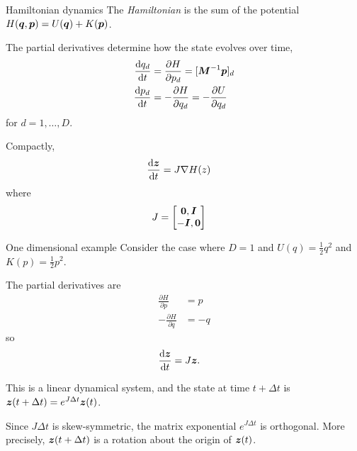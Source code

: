 \documentclass[aspectratio=169]{beamer}
\begin{document}
\begin{frame}{Hamiltonian dynamics}
    The \textit{Hamiltonian} is the sum of the potential $H(\boldsymbol{q}, \boldsymbol{p}) = U(\boldsymbol{q}) + K(\boldsymbol{p})$.
    
    The partial derivatives determine how the state evolves over time,
    \begin{align}
        \frac{\mathop{}\!\mathrm{d} q_d}{\mathop{}\!\mathrm{d} t} &= \frac{\partial H}{\partial p_d} = [\boldsymbol{M}^{-1} \boldsymbol{p}]_d \\
        \frac{\mathop{}\!\mathrm{d} p_d}{\mathop{}\!\mathrm{d} t} &= -\frac{\partial H}{\partial q_d} = -\frac{\partial  U}{\partial q_d}
    \end{align}
    for $d=1,\ldots, D$.
    
    Compactly,
    \begin{align}
        \frac{\mathop{}\!\mathrm{d} \boldsymbol{z}}{\mathop{}\!\mathrm{d} t} &= J \nabla H(z)
    \end{align}
    where 
    \begin{align}
        J &= \begin{bmatrix} \boldsymbol{0}, \boldsymbol{I} \\ -\boldsymbol{I}, \boldsymbol{0}
        \end{bmatrix}
    \end{align}
    
\end{frame}

\begin{frame}{One dimensional example}
    Consider the case where $D=1$ and $U(q) = \tfrac{1}{2}q^2$ and $K(p) = \tfrac{1}{2}p^2$.
    
    The partial derivatives are 
    \begin{align}
        \frac{\partial H}{\partial p} &= p \\
        -\frac{\partial H}{\partial q} &= -q
    \end{align}
    so 
    \begin{align}
        \frac{\mathop{}\!\mathrm{d} \boldsymbol{z}}{\mathop{}\!\mathrm{d} t} &= J \boldsymbol{z}.
    \end{align}
    
    This is a linear dynamical system, and the state at time $t+\Delta t$ is $\boldsymbol{z}(t+ \Delta t) = e^{J\Delta t} \boldsymbol{z}(t)$.
    
    Since $J \Delta t$ is skew-symmetric, the matrix exponential $e^{J \Delta t}$ is orthogonal. More precisely, $\boldsymbol{z}(t + \Delta t)$ is a rotation about the origin of $\boldsymbol{z}(t)$.
    
\end{frame}
\end{document}
